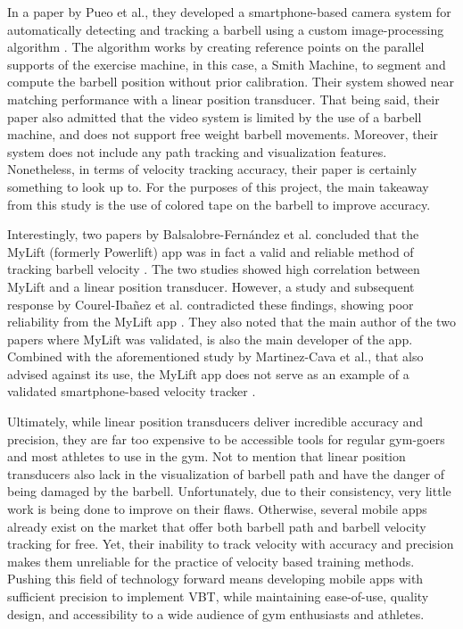\documentclass[10pt,twocolumn]{article}
\begin{document}
In a paper by Pueo et al., they developed a smartphone-based camera system for automatically detecting and tracking a barbell using a custom image-processing algorithm \cite{Pueo2021}.
The algorithm works by creating reference points on the parallel supports of the exercise machine, in this case, a Smith Machine, to segment and compute the barbell position without prior calibration.
Their system showed near matching performance with a linear position transducer.
That being said, their paper also admitted that the video system is limited by the use of a barbell machine, and does not support free weight barbell movements.
Moreover, their system does not include any path tracking and visualization features.
Nonetheless, in terms of velocity tracking accuracy, their paper is certainly something to look up to.
For the purposes of this project, the main takeaway from this study is the use of colored tape on the barbell to improve accuracy.\par

Interestingly, two papers by Balsalobre-Fern\'andez et al. concluded that the MyLift (formerly Powerlift) app was in fact a valid and reliable method of tracking barbell velocity \cite{Balsalobre-Fernández2017, Balsalobre-Fernández2018}. 
The two studies showed high correlation between MyLift and a linear position transducer.
However, a study and subsequent response by Courel-Iba\~nez et al. contradicted these findings, showing poor reliability from the MyLift app \cite{Courel-Ibáñez2020}.
They also noted that the main author of the two papers where MyLift was validated, is also the main developer of the app.
Combined with the aforementioned study by Martinez-Cava et al., that also advised against its use, the MyLift app does not serve as an example of a validated smartphone-based velocity tracker \cite{Martinez-Cava2020}.


Ultimately, while linear position transducers deliver incredible accuracy and precision, they are far too expensive to be accessible tools for regular gym-goers and most athletes to use in the gym.
Not to mention that linear position transducers also lack in the visualization of barbell path and have the danger of being damaged by the barbell.
Unfortunately, due to their consistency, very little work is being done to improve on their flaws. 
Otherwise, several mobile apps already exist on the market that offer both barbell path and barbell velocity tracking for free.
Yet, their inability to track velocity with accuracy and precision makes them unreliable for the practice of velocity based training methods.
Pushing this field of technology forward means developing mobile apps with sufficient precision to implement VBT, while maintaining ease-of-use, quality design, and accessibility to a wide audience of gym enthusiasts and athletes.
\end{document}

